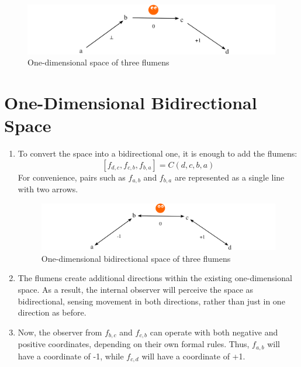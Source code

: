 \documentclass[final]{article}
\begin{document}
\begin{enumerate}
            \begin{figure}[H]
                \centering
                \includegraphics[width=\textwidth]{./1d-f1f2f3.png}
                \caption{One-dimensional space of three flumens}
                \label{fig:image}
            \end{figure}

        \end{enumerate}



    \section{One-Dimensional Bidirectional Space}

        \begin{enumerate}

            \item To convert the space into a bidirectional one, it is enough to
            add the flumens: \[ [f_{d,c}, f_{c,b}, f_{b,a}]=C(d,c,b,a) \] For
            convenience, pairs such as \( f_{a,b} \) and \(f_{b,a}\) are represented as a single line with
            two arrows.

            \begin{figure}[H]
                \centering
                \includegraphics[width=\textwidth]{./1d-f1f2f3-bidir.png}
                \caption{One-dimensional bidirectional space of three flumens}
                \label{fig:image}
            \end{figure}

            \item The flumens create additional directions within the existing
            one-dimensional space. As a result, the internal observer will perceive
            the space as bidirectional, sensing movement in both directions, rather than just
            in one direction as before.

            \item Now, the observer from \(f_{b,c}\) and \(f_{c,b}\) can operate
            with both negative and positive coordinates, depending on
            their own formal rules. Thus, \(f_{a,b}\) will have a coordinate
            of -1, while \(f_{c,d}\) will have a coordinate of +1.

        \end{enumerate}
\end{document}
